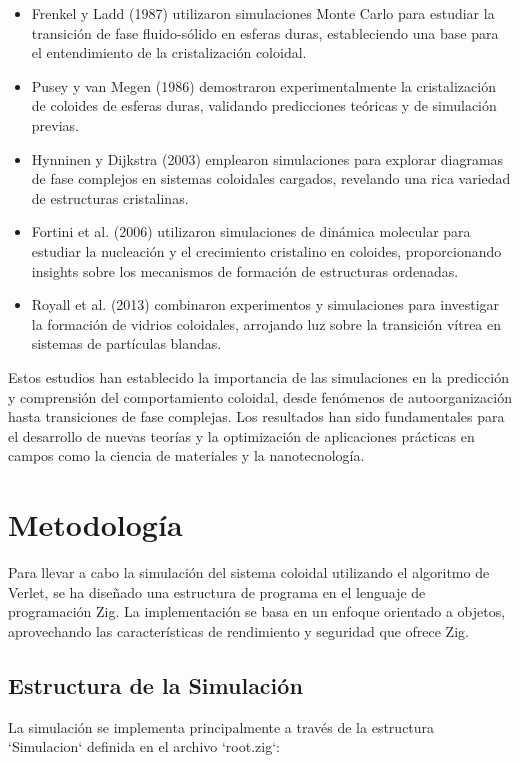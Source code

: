 \documentclass[twocolumn]{article}
\begin{document}
\begin{itemize}
    \item Frenkel y Ladd (1987) utilizaron simulaciones Monte Carlo para estudiar la transición de fase fluido-sólido en esferas duras, estableciendo una base para el entendimiento de la cristalización coloidal.

    \item Pusey y van Megen (1986) demostraron experimentalmente la cristalización de coloides de esferas duras, validando predicciones teóricas y de simulación previas.

    \item Hynninen y Dijkstra (2003) emplearon simulaciones para explorar diagramas de fase complejos en sistemas coloidales cargados, revelando una rica variedad de estructuras cristalinas.

    \item Fortini et al. (2006) utilizaron simulaciones de dinámica molecular para estudiar la nucleación y el crecimiento cristalino en coloides, proporcionando insights sobre los mecanismos de formación de estructuras ordenadas.

    \item Royall et al. (2013) combinaron experimentos y simulaciones para investigar la formación de vidrios coloidales, arrojando luz sobre la transición vítrea en sistemas de partículas blandas.
\end{itemize}

Estos estudios han establecido la importancia de las simulaciones en la predicción y comprensión del comportamiento coloidal, desde fenómenos de autoorganización hasta transiciones de fase complejas. Los resultados han sido fundamentales para el desarrollo de nuevas teorías y la optimización de aplicaciones prácticas en campos como la ciencia de materiales y la nanotecnología.

\section{Metodología}
Para llevar a cabo la simulación del sistema coloidal utilizando el algoritmo de Verlet, se ha diseñado una estructura de programa en el lenguaje de programación Zig. La implementación se basa en un enfoque orientado a objetos, aprovechando las características de rendimiento y seguridad que ofrece Zig.

\subsection*{Estructura de la Simulación}
La simulación se implementa principalmente a través de la estructura `Simulacion` definida en el archivo `root.zig`:
\end{document}
